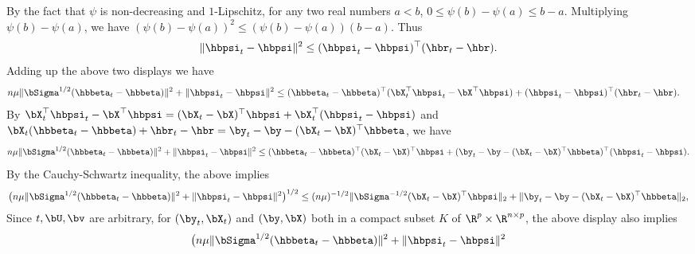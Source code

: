 \documentclass{colt2022} %
\renewenvironment{proof}[1][]
{
    \begin{newproof}
    \ifthenelse{\equal{#1}{}}{ }{\textbf{(#1) }}%
}{
    \end{newproof}
}
\numberwithin{equation}{section}
\begin{document}
\begin{proof}
    By the fact that $\psi$ is non-decreasing and $1$-Lipschitz,
    for any two real numbers $a < b$,
    $ 
        0 \leq \psi(b) - \psi(a) \leq b - a.
    $
    Multiplying $\psi(b) - \psi(a)$, 
    we have
    $ 
        (\psi(b) - \psi(a))^{2} \leq (\psi (b) - \psi(a)) (b - a) 
        .
    $
    Thus
    \begin{align*}
        \| \hbpsi_{t} - \hbpsi \|^{2}
        \leq
       (\hbpsi_{t} - \hbpsi)^{\top} (\hbr_{t} - \hbr).
    \end{align*}
    Adding up the above two displays we have
    \begin{align}
        \label{eq:3363}
        &n\mu \|\bSigma^{1/2}(\hbbeta_{t} - \hbbeta)\|^{2}
        +
        \| \hbpsi _{t} - \hbpsi \|^{2}
        \leq
        (\hbbeta_{t} - \hbbeta)^{\top}
        (\bX_{t}^{\top} \hbpsi_{t} - \bX^{\top} \hbpsi)
        +
        (\hbpsi_{t} - \hbpsi)^{\top} (\hbr_{t} - \hbr)
        .
    \end{align}
    By
    $
        \bX_{t}^{\top} \hbpsi_{t}
        -
        \bX^{\top} \hbpsi
        =
        (\bX_{t}- \bX)^{\top} \hbpsi
        +
        \bX^{\top}_{t} (\hbpsi _{t} - \hbpsi)
    $ and
    $\bX_{t} (\hbbeta_{t} - \hbbeta) + \hbr_{t} - \hbr 
        = 
        \by_{t} - \by - (\bX_{t} - \bX)^{\top} \hbbeta$,
    we have
    \begin{align*}
        n\mu \|\bSigma^{1/2}( \hbbeta _{t} - \hbbeta )\|^{2}
        + \| \hbpsi_{t} - \hbpsi \|^{2}
        \leq 
        (\hbbeta_{t} - \hbbeta)^{\top} 
        (\bX_{t} - \bX)^{\top} \hbpsi
        + 
        (\by_{t} - \by - (\bX_{t} - \bX )^{\top} \hbbeta ) ^{\top} (\hbpsi _{t} - \hbpsi).
    \end{align*}
    By the Cauchy-Schwartz inequality, the above implies 
    \begin{align*}
        \bigl(
            n \mu \|\bSigma^{1/2}( \hbbeta _{t} - \hbbeta )\|^{2}
             + 
             \| \hbpsi _{t} - \hbpsi \|^{2}
        \bigr)^{1/2}
        \leq
        (n\mu)^{-1/2} \| \bSigma^{-1/2}(\bX_{t} - \bX)^{\top} \hbpsi \|_{2}
        +
        \|\by_{t} - \by - (\bX_{t} - \bX )^{\top} \hbbeta \|_{2},
    \end{align*}
    Since $t,\bU,\bv$ are arbitrary,
    for $(\by_{t}, \bX_{t})$ and $(\by,\bX)$ both in a compact subset $K$ of $\R^{p} \times \R^{n \times p}$,
    the above display also implies
    \begin{align*}
        \bigl(
            n \mu \| \bSigma^{1/2} (\hbbeta _{t} - \hbbeta) \|^{2}
             + 
             \| \hbpsi _{t} - \hbpsi \|^{2}

\end{align*}
\end{proof}
\end{document}

